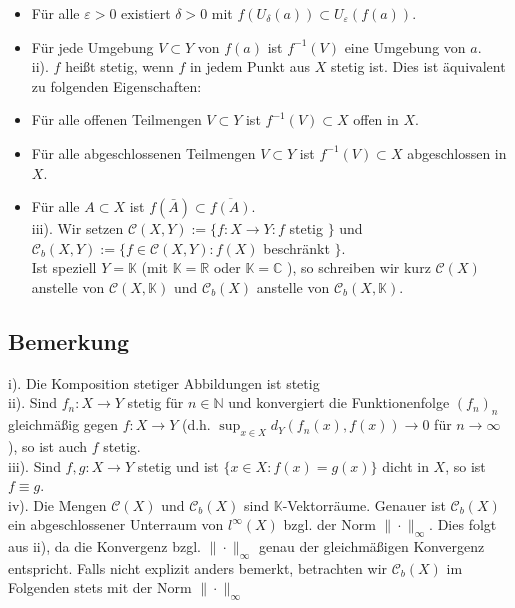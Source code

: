 \documentclass[10pt, letterpaper]{article}
\begin{document}
\begin{itemize}
  \item Für alle $\varepsilon>0$ existiert $\delta>0$ mit $f\left(U_{\delta}(a)\right) \subset U_{\varepsilon}(f(a))$.
  \item Für jede Umgebung $V \subset Y$ von $f(a)$ ist $f^{-1}(V)$ eine Umgebung von $a$.\\
ii). $f$ heißt stetig, wenn $f$ in jedem Punkt aus $X$ stetig ist. Dies ist äquivalent zu folgenden Eigenschaften:
  \item Für alle offenen Teilmengen $V \subset Y$ ist $f^{-1}(V) \subset X$ offen in $X$.
  \item Für alle abgeschlossenen Teilmengen $V \subset Y$ ist $f^{-1}(V) \subset X$ abgeschlossen in $X$.
  \item Für alle $A \subset X$ ist $f(\bar{A}) \subset \overline{f(A)}$.\\
iii). Wir setzen $\mathcal{C}(X, Y):=\{f: X \rightarrow Y: f$ stetig $\}$ und $\mathcal{C}_{b}(X, Y):=\{f \in \mathcal{C}(X, Y): f(X)$ beschränkt $\}.$\\
Ist speziell $Y=\mathbb{K}$ (mit $\mathbb{K}=\mathbb{R}$ oder $\mathbb{K}=\mathbb{C}$ ), so schreiben wir kurz $\mathcal{C}(X)$ anstelle von $\mathcal{C}(X, \mathbb{K})$ und $\mathcal{C}_{b}(X)$ anstelle von $\mathcal{C}_{b}(X, \mathbb{K})$.
\end{itemize}

\subsection*{Bemerkung}
i). Die Komposition stetiger Abbildungen ist stetig\\
ii). Sind $f_{n}: X \rightarrow Y$ stetig für $n \in \mathbb{N}$ und konvergiert die Funktionenfolge $\left(f_{n}\right)_{n}$ gleichmäßig gegen $f: X \rightarrow Y$ (d.h. $\sup _{x \in X} d_{Y}\left(f_{n}(x), f(x)\right) \rightarrow 0$ für $n \rightarrow \infty$ ), so ist auch $f$ stetig.\\
iii). Sind $f, g: X \rightarrow Y$ stetig und ist $\{x \in X: f(x)=g(x)\}$ dicht in $X$, so ist $f \equiv g$.\\
iv). Die Mengen $\mathcal{C}(X)$ und $\mathcal{C}_{b}(X)$ sind $\mathbb{K}$-Vektorräume. Genauer ist $\mathcal{C}_{b}(X)$ ein abgeschlossener Unterraum von $l^{\infty}(X)$ bzgl. der Norm $\|\cdot\|_{\infty}$. Dies folgt aus ii), da die Konvergenz bzgl. $\|\cdot\|_{\infty}$ genau der gleichmäßigen Konvergenz entspricht. Falls nicht explizit anders bemerkt, betrachten wir $\mathcal{C}_{b}(X)$ im Folgenden stets mit der Norm $\|\cdot\|_{\infty}$
\end{document}
